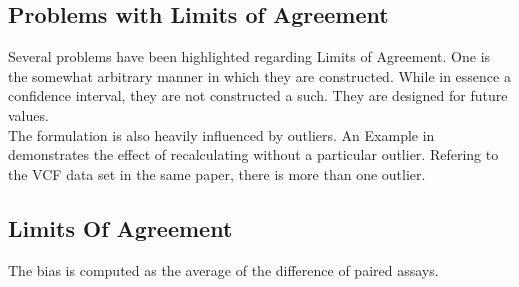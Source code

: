 \documentclass[Main.tex]{subfiles}
\begin{document}

	
	
	
	
	\subsection{Problems with Limits of Agreement}
	
	Several problems have been highlighted regarding Limits of
	Agreement. One is the somewhat arbitrary manner in which they are
	constructed. While in essence a confidence interval, they are not
	constructed a such. They are designed for future values.
	\\
	The formulation is also heavily influenced by outliers. An Example
	in \citet*{BA83} demonstrates the effect of recalculating without
	a particular outlier. Refering to the VCF data set in the same
	paper, there is more than one outlier.
	
	
	


	\subsection{Limits Of Agreement}
	
	The bias is computed as the average of the difference of paired
	assays.
	
\end{document}
